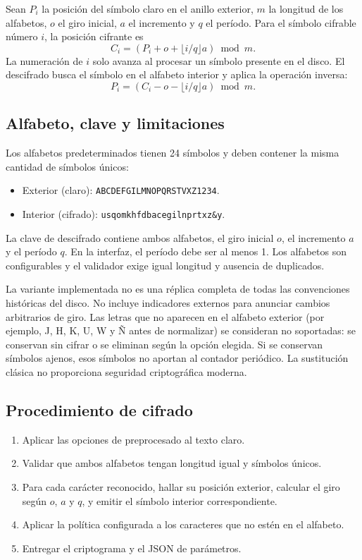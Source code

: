 \documentclass[11pt,a4paper]{article}
\begin{document}
Sean $P_i$ la posición del símbolo claro en el anillo exterior, $m$ la longitud de los alfabetos, $o$ el giro inicial, $a$ el incremento y $q$ el período. Para el símbolo cifrable número $i$, la posición cifrante es
\[
  C_i = (P_i + o + \lfloor i/q\rfloor a)\bmod m.
\]
La numeración de $i$ solo avanza al procesar un símbolo presente en el disco. El descifrado busca el símbolo en el alfabeto interior y aplica la operación inversa:
\[
  P_i = (C_i - o - \lfloor i/q\rfloor a)\bmod m.
\]

\subsection{Alfabeto, clave y limitaciones}
Los alfabetos predeterminados tienen 24 símbolos y deben contener la misma cantidad de símbolos únicos:
\begin{itemize}
  \item Exterior (claro): \texttt{ABCDEFGILMNOPQRSTVXZ1234}.
  \item Interior (cifrado): \texttt{usqomkhfdbacegilnprtxz\&y}.
\end{itemize}
La clave de descifrado contiene ambos alfabetos, el giro inicial $o$, el incremento $a$ y el período $q$. En la interfaz, el período debe ser al menos 1. Los alfabetos son configurables y el validador exige igual longitud y ausencia de duplicados.

La variante implementada no es una réplica completa de todas las convenciones históricas del disco. No incluye indicadores externos para anunciar cambios arbitrarios de giro. Las letras que no aparecen en el alfabeto exterior (por ejemplo, J, H, K, U, W y Ñ antes de normalizar) se consideran no soportadas: se conservan sin cifrar o se eliminan según la opción elegida. Si se conservan símbolos ajenos, esos símbolos no aportan al contador periódico. La sustitución clásica no proporciona seguridad criptográfica moderna.

\subsection{Procedimiento de cifrado}
\begin{enumerate}
  \item Aplicar las opciones de preprocesado al texto claro.
  \item Validar que ambos alfabetos tengan longitud igual y símbolos únicos.
  \item Para cada carácter reconocido, hallar su posición exterior, calcular el giro según $o$, $a$ y $q$, y emitir el símbolo interior correspondiente.
  \item Aplicar la política configurada a los caracteres que no estén en el alfabeto.
  \item Entregar el criptograma y el JSON de parámetros.
\end{enumerate}
\end{document}
